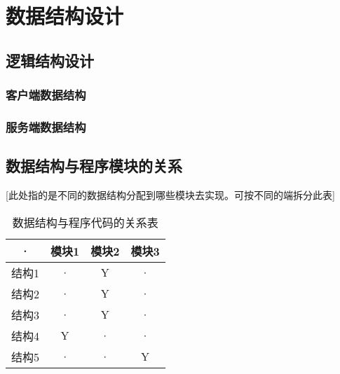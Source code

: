 \chapter{数据结构设计}
\section{逻辑结构设计}

\subsection{客户端数据结构}
\subsection{服务端数据结构}


\section{数据结构与程序模块的关系}
[此处指的是不同的数据结构分配到哪些模块去实现。可按不同的端拆分此表]
\begin{table}[htbp]
\centering
\caption{数据结构与程序代码的关系表} \label{tab:datastructure-module}
\begin{tabular}{|c|c|c|c|}
    \hline
    · & 模块1 & 模块2 & 模块3 \\
    \hline
    结构1 & · & Y & · \\
    \hline
    结构2 & · & Y & · \\
    \hline
    结构3 & · & Y & · \\
    \hline
    结构4 & Y & · & · \\
    \hline
    结构5 & · & · & Y \\
    \hline
\end{tabular}
\end{table}